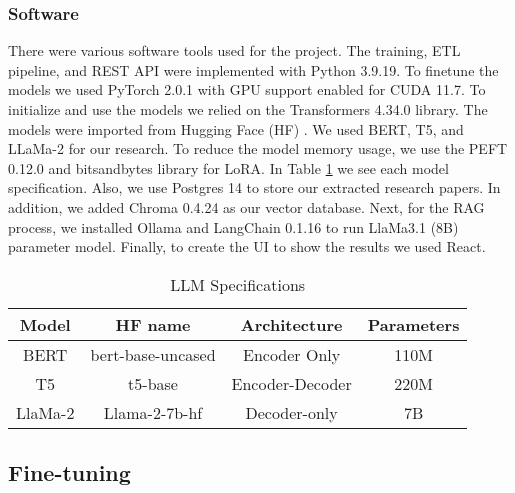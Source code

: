 \subsubsection{Software}
There were various software tools used for the project. The training, ETL pipeline, and REST API were implemented with Python 3.9.19. To finetune the models we used PyTorch 2.0.1 with GPU support enabled for
CUDA 11.7. To initialize and use the models we relied on  the Transformers 4.34.0 library. The models were imported from Hugging Face (HF) \cite{huggingface}. We used BERT, T5, and LLaMa-2 for our research. To reduce the model memory usage, we use the PEFT 0.12.0 and bitsandbytes library for LoRA. In Table \ref{table:LLM} we see each model specification. Also, we use Postgres 14 to store our extracted research papers. In addition, we added Chroma 0.4.24 as our vector database. Next, for the RAG process, we installed Ollama \cite{ollama} and LangChain 0.1.16 to run LlaMa3.1 (8B) \cite{touvron2023llamaopenefficientfoundation} parameter model. Finally, to create the UI to show the results we used React.

  \begin{table}[ht!]
\centering
\caption{LLM Specifications}
{\scriptsize
\begin{tabular}{||c | c | c | c||} 
 \hline
\textbf{Model} & \textbf{HF name} & \textbf{Architecture} & \textbf{Parameters} \\ [0.5ex] 
 \hline
 BERT & bert-base-uncased & Encoder Only & 110M \\ 
 \hline
 T5 & t5-base & Encoder-Decoder & 220M \\
 \hline
 LlaMa-2 & Llama-2-7b-hf & Decoder-only & 7B \\
 \hline
\end{tabular}
}
\label{table:LLM}
\end{table}

\subsection{Fine-tuning}


